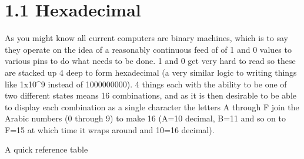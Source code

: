 \documentclass[
]{book}
\begin{document}
\hypertarget{hexadecimal}{%
\section{1.1 Hexadecimal}\label{hexadecimal}}

As you might know all current computers are binary machines, which is to say they operate on the idea of a reasonably continuous feed of of 1 and 0 values to various pins to do what needs to be done. 1 and 0 get very hard to read so these are stacked up 4 deep to form hexadecimal (a very similar logic to writing things like 1x10\^{}9 instead of 1000000000). 4 things each with the ability to be one of two different states means 16 combinations, and as it is then desirable to be able to display each combination as a single character the letters A through F join the Arabic numbers (0 through 9) to make 16 (A=10 decimal, B=11 and so on to F=15 at which time it wraps around and 10=16 decimal).

A quick reference table
\end{document}
